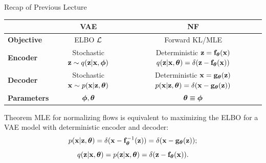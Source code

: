 \documentclass{beamer}
\begin{document}
\begin{frame}{Recap of Previous Lecture}
	\begin{table}[]
		\begin{tabular}{l|c|c}
			& \textbf{VAE} & \textbf{NF} \\ \hline
			\textbf{Objective} & ELBO $\mathcal{L}$ & Forward KL/MLE \\ \hline
			\textbf{Encoder} & \shortstack{Stochastic \\ $\mathbf{z} \sim q (\mathbf{z} | \mathbf{x}, \boldsymbol{\phi})$} &  \shortstack{\\ Deterministic \\ $\mathbf{z} = \mathbf{f}_{\boldsymbol{\theta}}(\mathbf{x})$ \\ $q(\mathbf{z} | \mathbf{x}, \boldsymbol{\theta}) = \delta(\mathbf{z} - \mathbf{f}_{\boldsymbol{\theta}}(\mathbf{x}))$}  \\ \hline
			\textbf{Decoder} & \shortstack{Stochastic \\ $\mathbf{x} \sim p (\mathbf{x} | \mathbf{z}, \boldsymbol{\theta})$} & \shortstack{\\ Deterministic \\ $\mathbf{x} = \mathbf{g}_{\boldsymbol{\theta}}(\mathbf{z})$ \\ $ p(\mathbf{x} | \mathbf{z}, \boldsymbol{\theta}) = \delta(\mathbf{x} - \mathbf{g}_{\boldsymbol{\theta}}(\mathbf{z}))$} \\ \hline
			\textbf{Parameters}  & $\boldsymbol{\phi}, \boldsymbol{\theta}$ & $\boldsymbol{\theta} \equiv \boldsymbol{\phi}$\\ 
		\end{tabular}
	\end{table}
	\begin{block}{Theorem}
		MLE for normalizing flows is equivalent to maximizing the ELBO for a VAE model with deterministic encoder and decoder:
		\vspace{-0.3cm}
		\[
		p(\mathbf{x} | \mathbf{z}, \boldsymbol{\theta}) = \delta (\mathbf{x} - \mathbf{f}^{-1}_{\boldsymbol{\theta}}(\mathbf{z})) = \delta (\mathbf{x} - \mathbf{g}_{\boldsymbol{\theta}}(\mathbf{z}));
		\]
		\[
		q(\mathbf{z} | \mathbf{x}, \boldsymbol{\theta}) = p(\mathbf{z} | \mathbf{x}, \boldsymbol{\theta}) = \delta (\mathbf{z} - \mathbf{f}_{\boldsymbol{\theta}}(\mathbf{x})).
		\]
	\end{block}
\end{frame}
\end{document}
